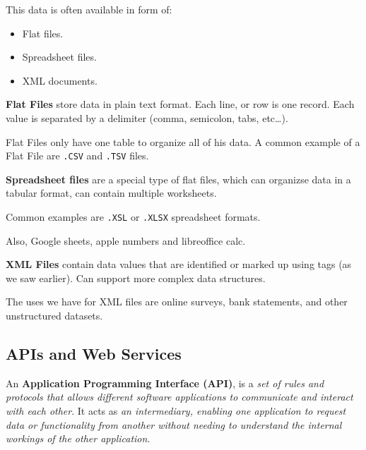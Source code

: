\documentclass[../../ibm_data_analysis.tex]{subfiles}
\begin{document}
    This data is often available in form of:
    \begin{itemize}
        \item Flat files.
        \item Spreadsheet files.
        \item XML documents.
    \end{itemize}

    \begin{mydef}
        \textbf{Flat Files} store data in plain text format. Each line, or row is one record. Each value is separated by a delimiter (comma, semicolon, tabs, etc\dots).
    \end{mydef}

    Flat Files only have one table to organize all of his data. A common example of a Flat File are \lstinline|.CSV| and \lstinline|.TSV| files.

    \begin{mydef}
        \textbf{Spreadsheet files} are a special type of flat files, which can organizse data in a tabular format, can contain multiple worksheets.
    \end{mydef}

    Common examples are \lstinline|.XSL| or \lstinline|.XLSX| spreadsheet formats.

    Also, Google sheets, apple numbers and libreoffice calc.

    \begin{mydef}
        \textbf{XML Files} contain data values that are identified or marked up using tags (as we saw earlier). Can support more complex data structures.
    \end{mydef}

    The uses we have for XML files are online surveys, bank statements, and other unstructured datasets.

    \subsection{APIs and Web Services}

    \begin{mydef}
        An \textbf{Application Programming Interface (API)}, is a \textit{set of rules and protocols that allows different software applications to communicate and interact with each other}. It acts as \textit{an intermediary, enabling one application to request data or functionality from another without needing to understand the internal workings of the other application}.
    \end{mydef}
\end{document}
